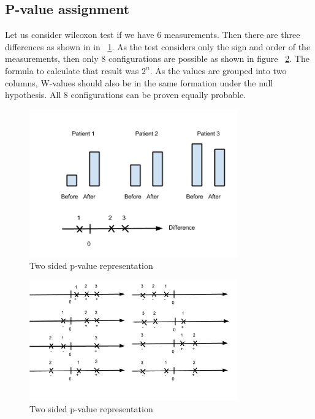 \documentclass[12pt]{article}
\begin{document}
\subsection{P-value assignment}
Let us consider wilcoxon test if we have 6 measurements. Then there are three differences as shown in in ~\ref{fig:patientExample}. As the test considers only the sign and order of the measurements, then only 8 configurations are possible as shown in figure ~\ref{fig:rankSignsExample}. The formula to calculate that result was $2^n$. As the values are grouped into two columns, W-values should also be in the same formation under the null hypothesis. All 8 configurations can be proven equally probable.
\begin{figure}[!h]
  \centering
  \includegraphics[width=0.8\textwidth]{patientExample}
  \caption{Two sided p-value representation}
  \label{fig:patientExample}
\end{figure}

\begin{figure}[!h]
  \centering
  \includegraphics[width=0.8\textwidth]{rankSignsExample}
  \caption{Two sided p-value representation}
  \label{fig:rankSignsExample}
\end{figure}
\end{document}
